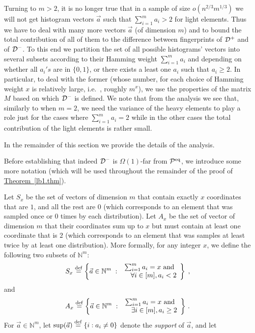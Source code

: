\documentclass[10pt]{article}
\theoremstyle{definition}
\providecommand{\ie}{i.e.\ }
\numberwithin{equation}{section}
\newcommand{\expref}[2]{\texorpdfstring{\hyperref[#2]{#1~\ref{#2}}}{#1~\ref{#2}}}
\newcommand{\calD}{{\cal D}}
\newcommand{\eqdef}{\stackrel{\rm def}{=}}
\newcommand{\calPid}{{\cal P}^{\rm eq}}
\newcommand{\BEQ}{\begin{equation}} \newcommand{\EEQ}{\end{equation}}
\newcommand{\bitset}{\{0,1\}}
\begin{document}
Turning to $m> 2$, it is no longer true that in a sample of size $o(n^{2/3} m^{1/3})$
we will not get histogram vectors $\vec{a}$ such that $\sum_{i=1}^m a_i > 2$
for light elements. Thus we have to deal with many more vectors $\vec{a}$
(of dimension $m$)
and to bound the total contribution of all of them to the difference between
fingerprints of $\calD^+$ and of $\calD^-$.
To this end we partition the set of all possible histograms'
vectors into several subsets
according to their Hamming weight $\sum_{i=1}^m a_i$ and depending
on whether all $a_i's$ are in $\bitset$,
%
or there exists a least one $a_i$ such that $a_i \geq 2$.
In particular, to deal with the former (whose number, for each choice of
Hamming weight $x$ is relatively large, \ie, roughly $m^x$), we use
the properties of the matrix $M$ based on which $\calD^-$ is defined.
We note that from the analysis we see that, similarly to when $m=2$, we need the variance of the heavy elements to play a role just for the cases where $\sum_{i=1}^m a_i = 2$ while in the other cases the total contribution of the light elements is rather small.

\noindent
In the remainder of this section we provide the details of the analysis.

\medskip

%

Before establishing that indeed
$\calD^-$ is $\Omega(1)$-far from $\calPid$,
we introduce some more notation (which will be used throughout
the remainder of the proof of \expref{Theorem}{lb1.thm}).




%
Let $S_x$ be the set of vectors of dimension $m$ that contain exactly $x$ coordinates that are $1$,
and all the rest are $0$ (which corresponds to an element that was sampled once or $0$ times by each distribution). Let $A_x$ be the set of vector of dimension $m$ that their coordinates sum up to $x$ but must contain at least one
coordinate that is $2$ (which corresponds to an element that was samples at least twice by at least one distribution).
More formally, for any integer $x$, we define the following two subsets
of $\mathbb{N}^m$:
\BEQ
S_x \eqdef \left\{\vec{a}\in \mathbb{N}^m\; :\;
\begin{array}{rl} \sum_{i=1}^m a_i = x \text{ and } \\ \forall i\in[m], a_i < 2 \end{array}
\right\} \;,
\label{Sx-def.eq}
\EEQ
and
\BEQ
A_x \eqdef \left\{\vec{a}\in \mathbb{N}^m \;:\;
  \begin{array}{rl} \sum_{i=1}^m a_i = x \text{ and } \\ \exists i\in[m], a_i\geq 2  \end{array} \right\}\,.
\label{Ax-def.eq}
\EEQ
For $\vec{a}\in \mathbb{N}^m$,
let ${\rm sup}(\vec{a}) \eqdef \{i:a_i \neq 0\}$ denote the \emph{support}
of $\vec{a}$, and let
%
%
%
%
%
\end{document}
